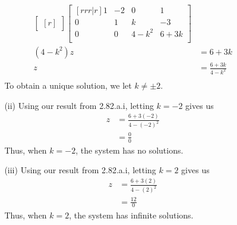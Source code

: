 \documentclass[12pt]{article}
\begin{document}
\begin{enumerate}
\begin{enumerate}
\begin{enumerate}
\begin{align*}
\begin{bmatrix}[r]
		\end{bmatrix}
		\begin{bmatrix}[rrr|r]
		1 & -2 & 0 & 1\\
		0 & 1 & k & -3\\
		0 & 0 & 4-k^2 & 6+3k\\
		\end{bmatrix}&\\
		(4-k^2)z &= 6+3k\\
		z &= \frac{6+3k}{4-k^2}\\
		\end{align*}
		To obtain a unique solution, we let $k \neq \pm 2$.\\
		
		\item [(ii)]
		Using our result from 2.82.a.i, letting $k=-2$ gives us
		\begin{align*}
		z &= \frac{6+3(-2)}{4-(-2)^2}\\
		&= \frac{0}{0}
		\end{align*}
		Thus, when $k=-2$, the system has no solutions.\\
		
		\item [(iii)] 
		Using our result from 2.82.a.i, letting $k=2$ gives us
		\begin{align*}
		z &= \frac{6+3(2)}{4-(2)^2}\\
		&= \frac{12}{0}
		\end{align*}
		Thus, when $k=2$, the system has infinite solutions.\\
		

\end{enumerate}
\end{enumerate}
\end{enumerate}
\end{document}
